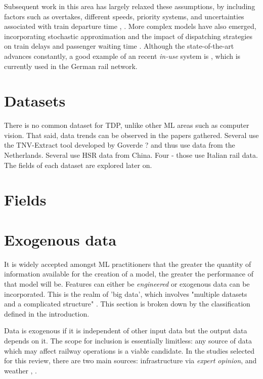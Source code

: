 \documentclass{article}
\begin{document}
Subsequent work in this area has largely relaxed these assumptions, by including factors such as overtakes, different speeds, priority systems, and uncertainties associated with train departure time \cite{petersen_1974}, \cite{chen_harker_1990}. More complex models have also emerged, incorporating stochastic approximation \cite{carey_kwiecinski_1994} and the impact of dispatching strategies on train delays
and passenger waiting time \cite{ozekici_sengor_1994}. Although the state-of-the-art advances constantly, a good example of an recent \textit{in-use} system is \cite{berger_et_al_2011}, which is currently used in the German rail network.

\section{Datasets}

There is no common dataset for TDP, unlike other ML areas such as computer vision. That said, data trends can be observed in the papers gathered. Several use the TNV-Extract tool developed by Goverde ? and thus use data from the Netherlands. Several use HSR data from China. Four - those use Italian rail data. The fields of each dataset are explored later on. 

\section{Fields}

\section{Exogenous data}

It is widely accepted amongst ML practitioners that the greater the quantity of information available for the creation of a model, the greater the performance of that model will be. Features can either be \textit{engineered} or exogenous data can be incorporated. This is the realm of 'big data', which involves "multiple datasets and a complicated structure" \cite{Ghofrani_et_al_2018}. This section is broken down by the classification defined in the introduction.

Data is exogenous if it is independent of other input data but the output data depends on it. The scope for inclusion is essentially limitless: any source of data which may affect railway operations is a viable candidate. 
In the studies selected for this review, there are two main sources: infrastructure \cite{markovic_et_al_2015} \cite{milinkovic_et_al_2013} via \textit{expert opinion}, and weather \cite{oneto_et_al_2017} \cite{oneto_et_al_2018}, \cite{oneto_et_al_2019}. 
\end{document}
